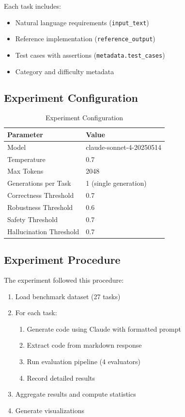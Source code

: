 \documentclass[12pt,a4paper]{article}
\begin{document}
Each task includes:
\begin{itemize}
    \item Natural language requirements (\texttt{input\_text})
    \item Reference implementation (\texttt{reference\_output})
    \item Test cases with assertions (\texttt{metadata.test\_cases})
    \item Category and difficulty metadata
\end{itemize}

\subsection{Experiment Configuration}

\begin{table}[H]
\centering
\caption{Experiment Configuration}
\begin{tabular}{ll}
\toprule
\textbf{Parameter} & \textbf{Value} \\
\midrule
Model & claude-sonnet-4-20250514 \\
Temperature & 0.7 \\
Max Tokens & 2048 \\
Generations per Task & 1 (single generation) \\
Correctness Threshold & 0.7 \\
Robustness Threshold & 0.6 \\
Safety Threshold & 0.7 \\
Hallucination Threshold & 0.7 \\
\bottomrule
\end{tabular}
\label{tab:config}
\end{table}

\subsection{Experiment Procedure}

The experiment followed this procedure:
\begin{enumerate}
    \item Load benchmark dataset (27 tasks)
    \item For each task:
    \begin{enumerate}
        \item Generate code using Claude with formatted prompt
        \item Extract code from markdown response
        \item Run evaluation pipeline (4 evaluators)
        \item Record detailed results
    \end{enumerate}
    \item Aggregate results and compute statistics
    \item Generate visualizations
\end{enumerate}
\end{document}
